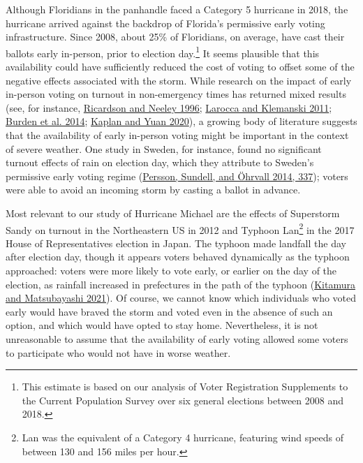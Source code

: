 \documentclass[
  12pt,
]{article}
\begin{document}
Although Floridians in the panhandle faced a Category 5 hurricane in 2018, the hurricane arrived against the backdrop of Florida's permissive early voting infrastructure. Since 2008, about 25\% of Floridians, on average, have cast their ballots early in-person, prior to election day.\footnote{This estimate is based on our analysis of Voter Registration Supplements to the Current Population Survey over six general elections between 2008 and 2018.} It seems plausible that this availability could have sufficiently reduced the cost of voting to offset some of the negative effects associated with the storm. While research on the impact of early in-person voting on turnout in non-emergency times has returned mixed results (see, for instance, \protect\hyperlink{ref-Ricardson1996}{Ricardson and Neeley 1996}; \protect\hyperlink{ref-Larocca2011}{Larocca and Klemanski 2011}; \protect\hyperlink{ref-Burden2014}{Burden et al. 2014}; \protect\hyperlink{ref-Kaplan2020}{Kaplan and Yuan 2020}), a growing body of literature suggests that the availability of early in-person voting might be important in the context of severe weather. One study in Sweden, for instance, found no significant turnout effects of rain on election day, which they attribute to Sweden's permissive early voting regime (\protect\hyperlink{ref-Persson2014}{Persson, Sundell, and Öhrvall 2014, 337}); voters were able to avoid an incoming storm by casting a ballot in advance.

Most relevant to our study of Hurricane Michael are the effects of Superstorm Sandy on turnout in the Northeastern US in 2012 and Typhoon Lan\footnote{Lan was the equivalent of a Category 4 hurricane, featuring wind speeds of between 130 and 156 miles per hour.} in the 2017 House of Representatives election in Japan. The typhoon made landfall the day after election day, though it appears voters behaved dynamically as the typhoon approached: voters were more likely to vote early, or earlier on the day of the election, as rainfall increased in prefectures in the path of the typhoon (\protect\hyperlink{ref-Kitamura2021}{Kitamura and Matsubayashi 2021}). Of course, we cannot know which individuals who voted early would have braved the storm and voted even in the absence of such an option, and which would have opted to stay home. Nevertheless, it is not unreasonable to assume that the availability of early voting allowed some voters to participate who would not have in worse weather.
\end{document}
